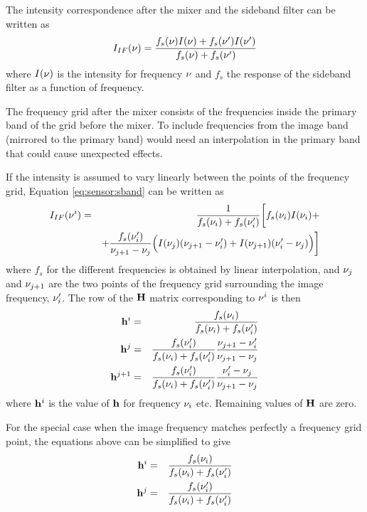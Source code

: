  The intensity correspondence after the mixer and the sideband filter
 can be written as
 \begin{equation}
   I_{IF}(\nu) = \frac{f_s(\nu)I(\nu)+f_s(\nu')I(\nu')}{f_s(\nu)+f_s(\nu')}
  \label{eq:sensor:sband}
 \end{equation}
 where $I(\nu)$ is the intensity for frequency $\nu$ and $f_s$ the response
 of the sideband filter as a function of frequency.

 The frequency grid after the mixer consists of the frequencies inside
 the primary band of the grid before the mixer. To include frequencies
 from the image band (mirrored to the primary band) would need an 
 interpolation in the primary band that could cause unexpected effects.  


 \label{sec:sensor:mixer:lins}

 If the intensity is assumed to vary linearly between the points of the
 frequency grid, Equation \ref{eq:sensor:sband} can be written as
 \begin{eqnarray}
   I_{IF}(\nu^i) &=& \frac{1}{f_s(\nu_i)+f_s(\nu_i')} \bigg[ f_s(\nu_i)I(\nu_i)+ \nonumber \\ 
      & & + \frac{f_s(\nu_i')}{\nu_{j+1}-\nu_j} \Big( I(\nu_j)(\nu_{j+1}-\nu_i')
           + I(\nu_{j+1})(\nu_i'-\nu_j) \Big)  \bigg]
  \label{eq:sensor:mixer}
 \end{eqnarray}
 where $f_s$ for the different frequencies is obtained by linear
 interpolation, and $\nu_j$ and $\nu_{j+1}$ are the two
 points of the frequency grid surrounding the image frequency,
 $\nu_i'$. The row of the $\mathbf{H}$ matrix corresponding to $\nu^i$ is then
 \begin{eqnarray}
    \label{eq:sensor:mixer:hi}
    \mathbf{h}^i &=& \frac{f_s(\nu_i)}{f_s(\nu_i)+f_s(\nu_i')}  \\
    \mathbf{h}^j &=& \frac{f_s(\nu_i')}{f_s(\nu_i)+f_s(\nu_i')}
                  \frac{\nu_{j+1}-\nu_i'}{\nu_{j+1}-\nu_j}     \nonumber \\
    \mathbf{h}^{j+1} &=& \frac{f_s(\nu_i')}{f_s(\nu_i)+f_s(\nu_i')}
                  \frac{\nu_i'-\nu_j}{\nu_{j+1}-\nu_j}     \nonumber
 \end{eqnarray}
 where $\mathbf{h}^i$ is the value of $\mathbf{h}$ for frequency $\nu_i$ etc.
 Remaining values of $\mathbf{H}$ are zero.

 For the special case when the image frequency matches perfectly a frequency
 grid point, the equations above can be simplified to give
 \begin{eqnarray}
    \mathbf{h}^i &=& \frac{f_s(\nu_i)}{f_s(\nu_i)+f_s(\nu_i')}    \nonumber \\
    \mathbf{h}^j &=& \frac{f_s(\nu_i')}{f_s(\nu_i)+f_s(\nu_i')}    \nonumber
 \end{eqnarray}


